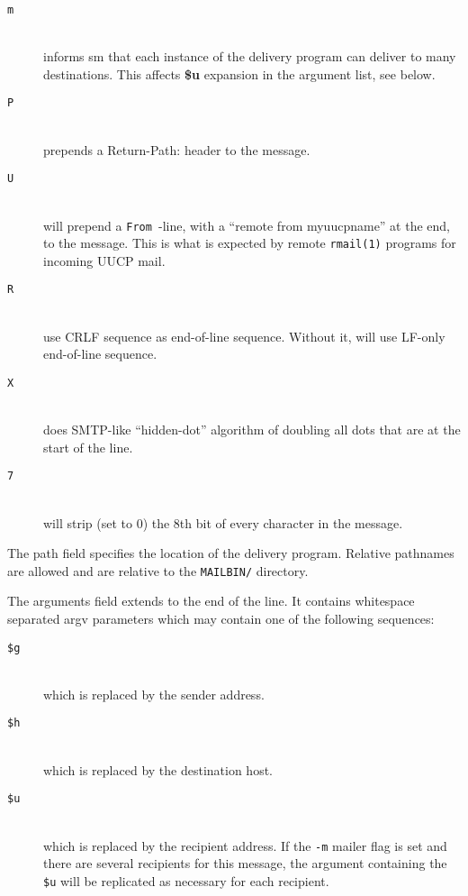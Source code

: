 \begin{description}
\item[ {\tt m}] \mbox{} \\
informs sm that each instance of the delivery program  
can deliver to many destinations. This affects {\bf \$u} expansion 
in the argument list, see below.

\item[ {\tt P}] \mbox{} \\
prepends a Return-Path: header to the message.

\item[ {\tt U}] \mbox{} \\
will prepend a \verb*/From /-line, with a ``remote from
myuucpname'' at the end, to the message. This is what is expected by remote 
{\tt rmail(1)} programs for incoming UUCP mail.

\item[ {\tt R}] \mbox{} \\
use CRLF sequence as end-of-line sequence. Without
it, will use LF-only end-of-line sequence.

\item[ {\tt X}] \mbox{} \\
does SMTP-like ``hidden-dot'' algorithm  of doubling
all dots that are at the start of the line.

\item[ {\tt 7}] \mbox{} \\
will strip (set to 0) the 8th bit of every character in the 
message.

\end{description}


The path field specifies the location of the delivery program. Relative 
pathnames are allowed and are relative to the {\tt MAILBIN/} directory.

The arguments field extends to the end of the line. It
contains  whitespace separated  argv  parameters which may
contain one of the following sequences:

\begin{description}
\item[ {\tt \$g}] \mbox{} \\
which is replaced by the sender address.

\item[ {\tt \$h}] \mbox{} \\
which is replaced by the destination host.

\item[ {\tt \$u}] \mbox{} \\
which is replaced by the recipient address.  If the
{\tt -m} mailer flag is set and there are several recipients for this 
message, the argument containing  the {\tt \$u} will be replicated 
as necessary for each recipient.

\end{description}
